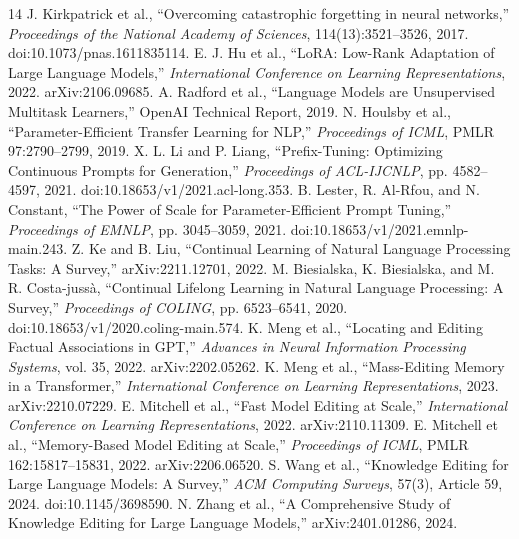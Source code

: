 \documentclass[12pt,a4paper]{article}
\begin{document}
\begin{thebibliography}{14}
 J. Kirkpatrick et al., ``Overcoming catastrophic forgetting in neural networks,'' \emph{Proceedings of the National Academy of Sciences}, 114(13):3521--3526, 2017. doi:10.1073/pnas.1611835114.
 E. J. Hu et al., ``LoRA: Low-Rank Adaptation of Large Language Models,'' \emph{International Conference on Learning Representations}, 2022. arXiv:2106.09685.
 A. Radford et al., ``Language Models are Unsupervised Multitask Learners,'' OpenAI Technical Report, 2019.
 N. Houlsby et al., ``Parameter-Efficient Transfer Learning for NLP,'' \emph{Proceedings of ICML}, PMLR 97:2790--2799, 2019.
 X. L. Li and P. Liang, ``Prefix-Tuning: Optimizing Continuous Prompts for Generation,'' \emph{Proceedings of ACL-IJCNLP}, pp. 4582--4597, 2021. doi:10.18653/v1/2021.acl-long.353.
 B. Lester, R. Al-Rfou, and N. Constant, ``The Power of Scale for Parameter-Efficient Prompt Tuning,'' \emph{Proceedings of EMNLP}, pp. 3045--3059, 2021. doi:10.18653/v1/2021.emnlp-main.243.
 Z. Ke and B. Liu, ``Continual Learning of Natural Language Processing Tasks: A Survey,'' arXiv:2211.12701, 2022.
 M. Biesialska, K. Biesialska, and M. R. Costa-jussà, ``Continual Lifelong Learning in Natural Language Processing: A Survey,'' \emph{Proceedings of COLING}, pp. 6523--6541, 2020. doi:10.18653/v1/2020.coling-main.574.
 K. Meng et al., ``Locating and Editing Factual Associations in GPT,'' \emph{Advances in Neural Information Processing Systems}, vol. 35, 2022. arXiv:2202.05262.
 K. Meng et al., ``Mass-Editing Memory in a Transformer,'' \emph{International Conference on Learning Representations}, 2023. arXiv:2210.07229.
 E. Mitchell et al., ``Fast Model Editing at Scale,'' \emph{International Conference on Learning Representations}, 2022. arXiv:2110.11309.
 E. Mitchell et al., ``Memory-Based Model Editing at Scale,'' \emph{Proceedings of ICML}, PMLR 162:15817--15831, 2022. arXiv:2206.06520.
 S. Wang et al., ``Knowledge Editing for Large Language Models: A Survey,'' \emph{ACM Computing Surveys}, 57(3), Article 59, 2024. doi:10.1145/3698590.
 N. Zhang et al., ``A Comprehensive Study of Knowledge Editing for Large Language Models,'' arXiv:2401.01286, 2024.
\end{thebibliography}
\end{document}

